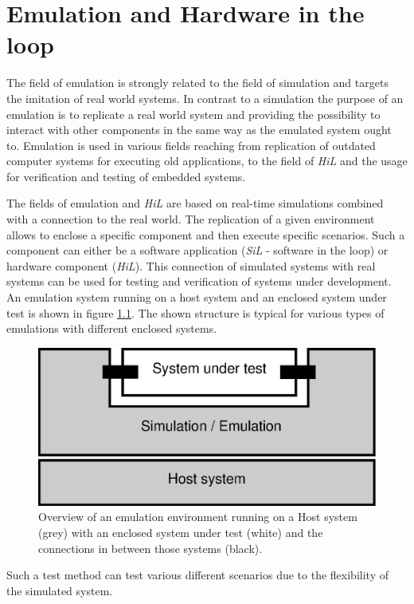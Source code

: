 \chapter{Emulation and Hardware in the loop}
\label{cha:emulation}

The field of emulation is strongly related to the field of simulation and targets the imitation of real world systems.
In contrast to a simulation the purpose of an emulation is to replicate a real world system and providing the possibility to interact with other components in the same way as the emulated system ought to.
Emulation is used in various fields reaching from replication of outdated computer systems for executing old applications, to the field of \emph{HiL} and the usage for verification and testing of embedded systems. \cite{emulation_koninklijke}

The fields of emulation and \emph{HiL} are based on real-time simulations combined with a connection to the real world.
The replication of a given environment allows to enclose a specific component and then execute specific scenarios.
Such a component can either be a software application (\emph{SiL} - software in the loop) or hardware component (\emph{HiL}).
This connection of simulated systems with real systems can be used for testing and verification of systems under development.
An emulation system running on a host system and an enclosed system under test is shown in figure \ref{fig:emulation_overview}.
The shown structure is typical for various types of emulations with different enclosed systems.

\begin{figure}
\centering
\includegraphics[width=0.7\linewidth]{images/emulation_overview}
\caption{Overview of an emulation environment running on a Host system (grey) with an enclosed system under test (white) and the connections in between those systems (black).}
\label{fig:emulation_overview}
\end{figure}



Such a test method can test various different scenarios due to the flexibility of the simulated system.
\cite[section I]{lu_low-cost_2007}

